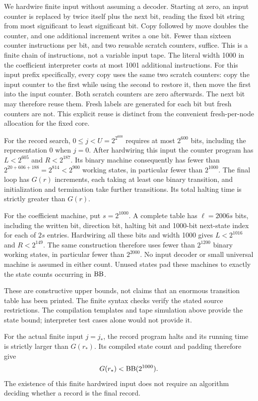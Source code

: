 We hardwire finite input without assuming a decoder. Starting at
zero, an input counter is replaced by twice itself plus the next
bit, reading the fixed bit string from most significant to least
significant bit. Copy followed by move doubles the counter, and
one additional increment writes a one bit. Fewer than sixteen
counter instructions per bit, and two reusable scratch counters,
suffice. This is a finite chain of instructions, not a variable
input tape. The literal width 1000 in the coefficient interpreter
costs at most 1001 additional instructions.
For this input prefix specifically, every copy uses the same two
scratch counters: copy the input counter to the first while using
the second to restore it, then move the first into the input
counter. Both scratch counters are zero afterwards. The next bit
may therefore reuse them. Fresh labels are generated for each bit
but fresh counters are not. This explicit reuse is distinct from
the convenient fresh-per-node allocation for the fixed core.

For the record search, $0\le j<U=2^{2^{600}}$ requires at most
$2^{600}$ bits, including the representation 0 when $j=0$.
After hardwiring this input the counter program has
$L<2^{605}$ and $R<2^{187}$. Its binary machine consequently has
fewer than $2^{20+606+188}=2^{814}<2^{900}$ working states, in particular fewer than
$2^{1000}$. The final loop has $G(r)$ increments, each taking at
least one binary transition, and initialization and termination
take further transitions. Its total halting time is strictly
greater than $G(r)$.

For the coefficient machine, put $s=2^{1000}$. A complete table
has $\ell=2006s$ bits, including the written bit, direction bit,
halting bit and 1000-bit next-state index for each of $2s$
entries. Hardwiring all these bits and width 1000 gives
$L<2^{1016}$ and $R<2^{149}$. The same construction therefore
uses fewer than $2^{1200}$ binary working states, in particular
fewer than $2^{2000}$. No input decoder or small universal
machine is assumed in either count. Unused states pad these
machines to exactly the state counts occurring in $\operatorname{BB}$.

These are constructive upper bounds, not claims that an enormous
transition table has been printed. The finite syntax checks verify
the stated source restrictions. The compilation templates and
tape simulation above provide the state bound; interpreter test
cases alone would not provide it.

For the actual finite input $j=j_*$, the record program halts and its
running time is strictly larger than $G(r_*)$. Its compiled state count
and padding therefore give
\[
 G(r_*)<\operatorname{BB}(2^{1000}).
\]
The existence of this finite hardwired input does not require an
algorithm deciding whether a record is the final record.


